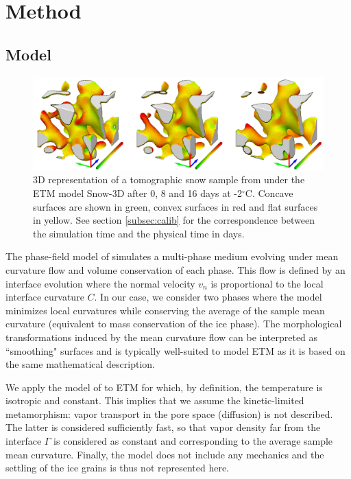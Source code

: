 \documentclass[draft,ms]{agujournal2019}
\begin{document}
\section{Method}
\label{sec:method}
\subsection{Model}
\label{subsec:model}


\begin{figure}
    \centering
    \includegraphics[width=\linewidth]{Figures/eboni_sous_volumes_simu.pdf}
    \caption{3D representation of a tomographic snow sample from \protect{} under the ETM model Snow-3D after 0, 8 and 16 days at -2$^\circ$C. Concave surfaces are shown in green, convex surfaces in red and flat surfaces in yellow. See section \ref{subsec:calib} for the correspondence between the simulation time and the physical time in days.}
    \label{fig:eboni_sous_volume}
\end{figure}

The phase-field model of  simulates a multi-phase medium evolving under mean curvature flow and volume conservation of each phase. This flow is defined by an interface evolution where the normal velocity $v_n$ is proportional to the local interface curvature $C$. In our case, we consider two phases where the model minimizes local curvatures while conserving the average of the sample mean curvature (equivalent to mass conservation of the ice phase). The morphological transformations induced by the mean curvature flow can be interpreted as ``smoothing" surfaces and is typically well-suited to model ETM as it is based on the same mathematical description. 

We apply the model of  to ETM for which, by definition, the temperature is isotropic and constant. This implies that we assume the kinetic-limited metamorphism: vapor transport in the pore space (diffusion) is not described. The latter is considered sufficiently fast, so that vapor density far from the interface $\Gamma$ is considered as constant and corresponding to the average sample mean curvature. Finally, the model does not include any mechanics and the settling of the ice grains is thus not represented here.\\
\end{document}
